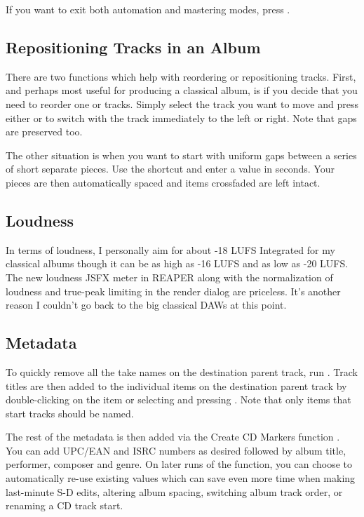 \documentclass[10pt,american]{article}
\begin{document}
If you want to exit both automation and mastering modes, press .

\subsection{Repositioning Tracks in an Album}

There are two functions which help with reordering or repositioning tracks.
First, and perhaps most useful for producing a classical album, is if you decide
that you need to reorder one or tracks. Simply select the track you want to move
and press either \keys{\ctrl+\arrowkeyleft}or \keys{\ctrl+\arrowkeyright} to
switch with the track immediately to the left or right. Note that gaps are
preserved too. 

The other situation is when you want to start with uniform gaps between a series
of short separate pieces. Use the  shortcut and enter a value in
seconds. Your pieces are then automatically spaced and items crossfaded are left
intact.

\subsection{Loudness}

In terms of loudness, I personally aim for about -18 LUFS Integrated for my
classical albums though it can be as high as -16 LUFS and as low as -20 LUFS.
The new loudness JSFX meter in REAPER along with the normalization of loudness
and true-peak limiting in the render dialog are priceless. It's another reason I
couldn't go back to the big classical DAWs at this point.

\subsection{Metadata}

To quickly remove all the take names on the destination parent track, run
. Track titles are then added to the individual items on the
destination parent track by double-clicking on the item or selecting and
pressing . Note that only items that start tracks should be named. 

The rest of the metadata is then added via the Create CD Markers function
. You can add UPC/EAN and ISRC numbers as desired followed by album
title, performer, composer and genre. On later runs of the function, you can
choose to automatically re-use existing values which can save even more time
when making last-minute S-D edits, altering album spacing, switching album track
order, or renaming a CD track start.
\end{document}
